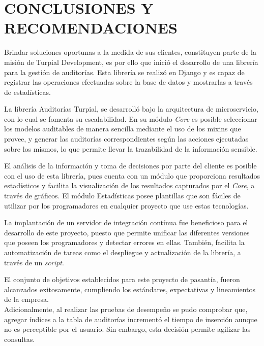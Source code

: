\chapter*{\textbf{CONCLUSIONES Y RECOMENDACIONES}}

\thispagestyle{empty}

Brindar soluciones oportunas a la medida de sus clientes, constituyen parte de la misión de Turpial Development, es por ello que inició el desarrollo de una librería para la gestión de auditorías. Esta librería se realizó en Django y es capaz de registrar las operaciones efectuadas sobre la base de datos y mostrarlas a través de estadísticas.

La librería Auditorías Turpial, se desarrolló bajo la arquitectura de microservicio, con lo cual se fomenta su escalabilidad. En su módulo \textit{Core} es posible seleccionar los modelos auditables de manera sencilla mediante el uso de los mixins que provee, y generar las auditorías correspondientes según las acciones ejecutadas sobre los mismos, lo que permite llevar la trazabilidad de la información sensible.

El análisis de la información y toma de decisiones por parte del cliente es posible con el uso de esta librería, pues cuenta con un módulo que proporciona resultados estadísticos y facilita la visualización de los resultados capturados por el \textit{Core}, a través de gráficos. El módulo Estadísticas posee plantillas que son fáciles de utilizar por los programadores en cualquier proyecto que use estas tecnologías.

La implantación de un servidor de integración contínua fue beneficioso para el desarrollo de este proyecto, puesto que permite unificar las diferentes versiones que poseen los programadores y detectar errores en ellas. También, facilita la automatización de tareas como el despliegue y actualización de la librería, a través de un \textit{script}.

El conjunto de objetivos establecidos para este proyecto de pasantía, fueron alcanzados  exitosamente, cumpliendo los estándares, expectativas y lineamientos de la empresa.\\

Adicionalmente, al realizar las pruebas de desempeño se pudo comprobar que, agregar índices a la tabla de auditorías incrementó el tiempo de inserción aunque no es perceptible por el usuario. Sin embargo, esta decisión permite agilizar las consultas.\\

